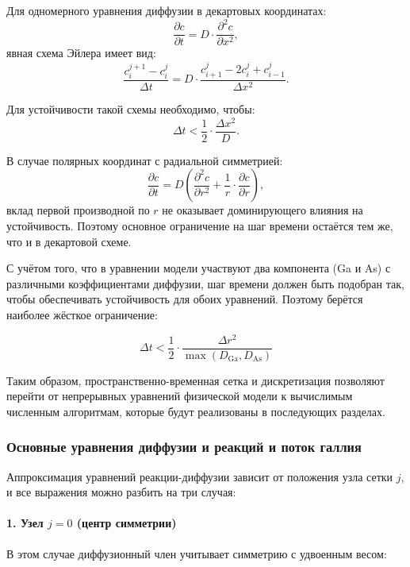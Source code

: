 \documentclass[14pt,oneside]{extarticle}
\begin{document}
Для одномерного уравнения диффузии в декартовых координатах:
\[
\frac{\partial c}{\partial t} = D \cdot \frac{\partial^2 c}{\partial x^2},
\]
явная схема Эйлера имеет вид:
\[
\frac{c_i^{j+1} - c_i^j}{\Delta t} = D \cdot \frac{c_{i+1}^j - 2c_i^j + c_{i-1}^j}{\Delta x^2}.
\]

Для устойчивости такой схемы необходимо\cite{leveque2007}, чтобы:
\begin{equation}
\Delta t < \frac{1}{2} \cdot \frac{\Delta x^2}{D}.
\label{eq:cfl_classic}
\end{equation}

В случае полярных координат с радиальной симметрией:
\[
\frac{\partial c}{\partial t} = D \left(
\frac{\partial^2 c}{\partial r^2} + \frac{1}{r} \cdot \frac{\partial c}{\partial r}
\right),
\]
вклад первой производной по \( r \) не оказывает доминирующего влияния на устойчивость. Поэтому основное ограничение на шаг времени остаётся тем же, что и в декартовой схеме.

С учётом того, что в уравнении модели участвуют два компонента (Ga и As) с различными коэффициентами диффузии, шаг времени должен быть подобран так, чтобы обеспечивать устойчивость для обоих уравнений. Поэтому берётся наиболее жёсткое ограничение:

\begin{equation}
\Delta t < \frac{1}{2} \cdot \frac{\Delta r^2}{\max(D_{\text{Ga}}, D_{\text{As}})}
\label{eq:cfl_final}
\end{equation}

Таким образом, пространственно-временная сетка и дискретизация позволяют перейти от непрерывных уравнений физической модели к вычислимым численным алгоритмам, которые будут реализованы в последующих разделах.

\subsubsection{Основные уравнения диффузии и реакций и поток галлия}

Аппроксимация уравнений реакции-диффузии зависит от положения узла сетки \( j \), и все выражения можно разбить на три случая:

\paragraph{1. Узел \( j = 0 \) (центр симметрии)}

В этом случае диффузионный член учитывает симметрию с удвоенным весом:
\end{document}
